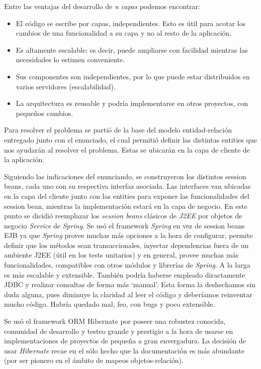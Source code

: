 \documentclass[letter]{article}
\begin{document}
Entre las ventajas del desarrollo de \textit{n capas} podemos encontrar:
\begin{itemize}
\item{El código se escribe por capas, independientes. Esto es útil para acotar los cambios de una funcionalidad a su capa y no al resto de la aplicación.}
\item{Es altamente escalable; es decir, puede ampliarse con facilidad mientras las necesidades lo estimen conveniente.}
\item{Sus componentes son independientes, por lo que puede estar distribuidos en varios servidores (escalabilidad).}
\item{La arquitectura es reusable y podría implementarse en otros proyectos, con pequeños cambios.}
\end{itemize}

Para resolver el problema se partió de la base del modelo entidad-relación entregado junto con el enunciado, el cual permitió definir las distintas entities que nos ayudarán al resolver el problema. Estas se ubicarán en la capa de cliente de la aplicación.

Siguiendo las indicaciones del enunciando, se construyeron los distintos session beans, cada uno con su respectiva interfaz asociada. Las interfaces van ubicadas en la capa del cliente junto con las entities para exponer las funcionalidades del session bean, mientras la implementación estará en la capa de negocio. En este punto se dicidió reemplazar los  \textit{session beans} clásicos de \textit{J2EE} por objetos de negocio \textit{Service} de \textit{Spring}. Se usó el framework \textit{Spring} en vez de session beans EJB ya que \textit{Spring} provee muchas más opciones a la hora de configurar, permite definir que los métodos sean transaccionales, inyectar dependencias fuera de un ambiente J2EE (útil en los tests unitarios) y en general, provee muchas más funcionalidades, compatibles con otros módulos y librerías de \textit{Spring}. A la larga es más escalable y extensible. También podría haberse empleado diractamente JDBC y realizar consultas de forma más `manual'. Esta forma la deshechamos sin duda alguna, pues diminuye la claridad al leer el código y deberíamos reinventar mucho código. Habría quedado mal, feo, con bugs y poco extensible.

Se usó el framework ORM Hibernate por poseer una robustez conocida, comunidad de desarrollo y testeo grande y prestigio a la hora de usarse en implementaciones de proyectos de pequeña a gran envergadura. La decisión de usar \textit{Hibernate} recae en el sólo hecho que la documentación es más abundante (por ser pionero en el ámbito de mapeos objetos-relación).
\end{document}
